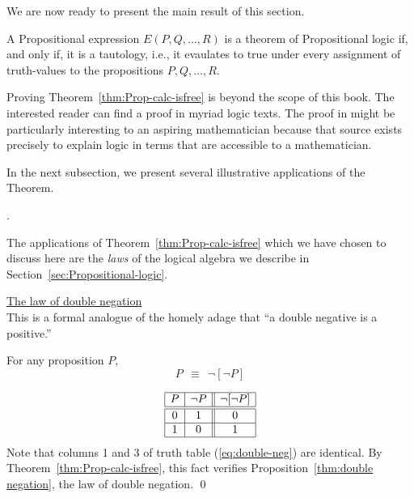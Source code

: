 We are now ready to present the main result of this section.

\begin{theorem}
\label{thm:Prop-calc-isfree}
A Propositional expression $E(P, Q, \ldots, R)$ is a theorem of
Propositional logic if, and only if, it is a tautology, i.e., it
evaulates to {\sc true} under every assignment of truth-values to the
propositions $P, Q, \ldots, R$.
\end{theorem}

Proving Theorem~\ref{thm:Prop-calc-isfree} is beyond the scope of this
book.  The interested reader can find a proof in myriad logic texts.
The proof in  \cite{Rosser53} might be particularly interesting to an
aspiring mathematician because that source exists precisely to explain
logic in terms that are accessible to a mathematician.

In the next subsection, we present several illustrative applications
of the Theorem.


\bigskip

.

The applications of Theorem~\ref{thm:Prop-calc-isfree} which we have
chosen to discuss here are the {\em laws} of the logical algebra we
describe in Section~\ref{sec:Propositional-logic}.

\bigskip

\noindent
\underline{\small\sf The law of double negation} \\
This is a formal analogue of the homely adage that ``a double negative
is a positive.''

\begin{prop}
\label{thm:double negation}
For any proposition $P$,
\[ P \ \ \equiv \ \ \neg [\neg P] \]
\end{prop}

\begin{equation}
\label{eq:double-neg}
\begin{array}{|c|c||c|}
\hline
P & \neg P & \neg[\neg P] \\
\hline
\hline
0 & 1 & 0 \\
\hline
1 & 0 & 1 \\
\hline
\end{array}
\end{equation}
Note that columns 1 and 3 of truth table (\ref{eq:double-neg}) are
identical.  By Theorem~\ref{thm:Prop-calc-isfree}, this fact verifies
Proposition~\ref{thm:double negation}, the law of double negation.
\qed

